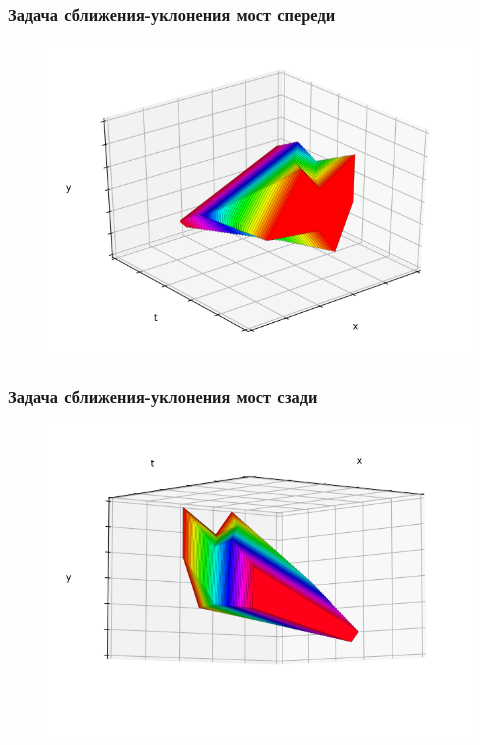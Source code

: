 \documentclass{beamer}
\begin{document}

  \begin{frame}
    \frametitle{Задача сближения-уклонения мост спереди}

    \begin{figure}
        \includegraphics[width=\linewidth,height=0.8\textheight,keepaspectratio]{example1_bridge_front}
    \end{figure} 

  \end{frame}


  \begin{frame}
    \frametitle{Задача сближения-уклонения мост сзади}

    \begin{figure}
        \includegraphics[width=\linewidth,height=0.8\textheight,keepaspectratio]{example1_bridge_back}
    \end{figure} 

  \end{frame}
\end{document}
